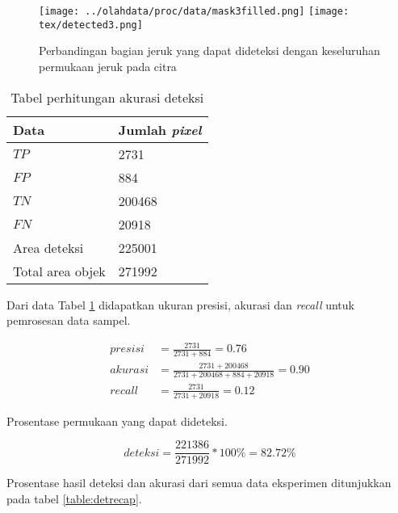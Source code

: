 \documentclass[laporan.tex]{subfiles}
\begin{document}
\begin{figure}[h!]
\centering
\texttt{[image: ../olahdata/proc/data/mask3filled.png]} \qquad
\texttt{[image: tex/detected3.png]}
\caption{Perbandingan bagian jeruk yang dapat dideteksi dengan keseluruhan permukaan jeruk pada citra}
\end{figure}

\begin{table}[h!]
\centering
\begin{tabular}{|l|l|}
\hline
Data & Jumlah \emph{pixel} \\
\hline
$TP$ & 2731 \\
$FP$ & 884 \\
$TN$ & 200468 \\
$FN$ & 20918 \\
Area deteksi & 225001 \\
Total area objek & 271992 \\
\hline
\end{tabular}
\caption{Tabel perhitungan akurasi deteksi}
\label{table:confuse3}
\end{table}

Dari data Tabel \ref{table:confuse3} didapatkan ukuran presisi, akurasi dan \emph{recall} untuk pemrosesan data sampel.

\begin{align*}
presisi & = \frac{2731}{2731 + 884}  = 0.76 \\
akurasi & = \frac{2731+200468}{2731+200468+884+20918}  = 0.90 \\
recall & = \frac{2731}{2731+20918}  = 0.12
\end{align*}

Prosentase permukaan yang dapat dideteksi.

\begin{equation*}
deteksi =\frac{221386}{271992} \ast 100\% = 82.72\%
\end{equation*}

Prosentase hasil deteksi dan akurasi dari semua data eksperimen ditunjukkan pada tabel \ref{table:detrecap}.
\end{document}
